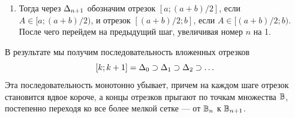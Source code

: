 \begin{enumerate}
\begin{enumerate}[{\bf Step1}]
Заметим, что и границы $\De_n$, и его середина --- это точки множества $\B$, причем границы $\De_n$ находятся в множестве $\B_n$, а его середина --- в множестве $\B_{n+1}$. Таким образом, это подразбиение является переходом к следующему уровню разбиения в множестве $\B$.
\item Тогда через $\Delta_{n+1}$ обозначим отрезок $[a;(a+b)/2]$, если $A\in[a;(a+b)/2)$, и отрезок $[(a+b)/2;b]$, если $A\in[(a+b)/2;b)$. После чего перейдем на предыдущий шаг, увеличивая номер $n$ на 1.
\end{enumerate}

В результате мы получим последовательность вложенных отрезков
$$
[k;k+1]=\Delta_0\supset\Delta_1\supset\Delta_2\supset\dots
$$
Эта последовательность монотонно убывает, причем на каждом шаге отрезок становится вдвое короче, а концы отрезков прыгают по точкам множества $\B$, постепенно переходя ко все более мелкой сетке --- от $\B_n$ к $\B_{n+1}$.


\end{enumerate}
